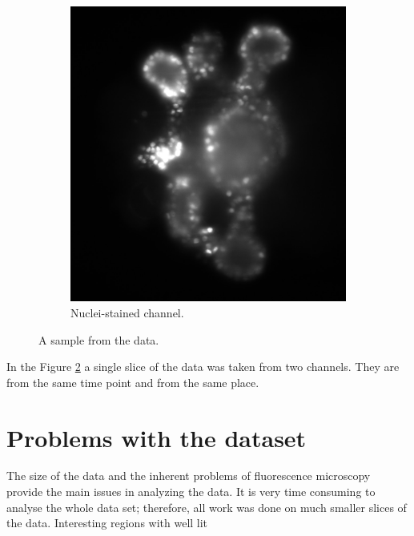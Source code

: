 \documentclass[
  digital,     %
  oneside,     %
  nosansbold,  %
  nocolorbold, %
  lof,         %
  lot,         %
]{fithesis4}
\begin{document}
\begin{figure}
\begin{subfigure}[t]{0.4\textwidth}
        \includegraphics[width=\textwidth]{resources/C2-t006-200-scaled.jpg}
        \caption{Nuclei-stained channel.}
        \label{fig:data_example_nuclei}
    \end{subfigure}
    \caption{A sample from the data.}
    \label{fig:data_example}
\end{figure}
In the Figure \ref{fig:data_example} a single slice of the data was taken from
two channels. They are from the same time point and from the same place.

\section{Problems with the dataset}

The size of the data and the inherent problems of fluorescence microscopy
provide the main issues in analyzing the data. It is very time consuming to
analyse the whole data set; therefore, all work was done on much smaller slices
of the data. Interesting regions with well lit
\end{document}

